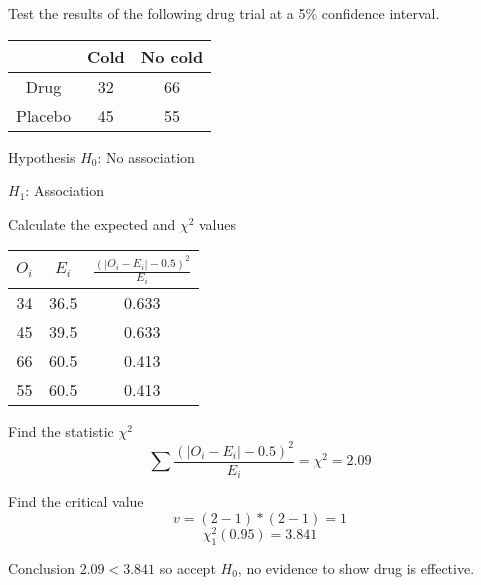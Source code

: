         \begin{example}
        {
            Test the results of the following drug trial at a 5\% confidence interval.
            
            \begin{center}
            \begin{tabular}{c|c|c}
                        & Cold  & No cold   \\
                \hline
                Drug    & 32    & 66        \\
                Placebo & 45    & 55        \\
            \end{tabular}
            \end{center}
        }
        
        
        \begin{step}{Hypothesis}
        $H_0$: No association
        
        $H_1$: Association
        \end{step}
        
        \begin{step}{Calculate the expected and $\chi^2$ values}
        \begin{center}
        \begin{tabular}{c|c|c}
            $O_i$ & $E_i$ & $\displaystyle\frac{(|O_i - E_i| - 0.5)^2}{E_i}$    \\[2ex]
            \hline
            \rule{0pt}{3.5ex} 
            34    & 36.5  & 0.633                                               \\[1ex]
            45    & 39.5  & 0.633                                               \\[1ex]
            66    & 60.5  & 0.413                                               \\[1ex]
            55    & 60.5  & 0.413                                               \\[1ex]
        \end{tabular}
        \end{center}
        \end{step}
        
        \begin{step}{Find the statistic $\chi^2$}
        $$\sum{\frac{(|O_i - E_i| - 0.5)^2}{E_i}} = \chi^2 = 2.09$$
        \end{step}
        
        \begin{step}{Find the critical value}
        $$v = (2-1)*(2-1) = 1$$
        $$\chi^2_1(0.95) = 3.841$$
        \end{step}
        
        \begin{step}{Conclusion}
        $2.09 < 3.841$ so accept $H_0$, no evidence to show drug is effective.
        \end{step}
        
        \end{example}

